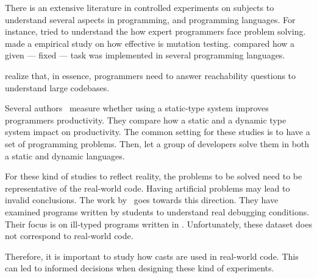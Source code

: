 There is an extensive literature \perse{} in controlled experiments on subjects to understand several aspects in programming, and programming languages.
For instance, \cite{solowayEmpiricalStudiesProgramming1984} tried to understand the how expert programmers face problem solving.
\cite{buddTheoreticalEmpiricalStudies1980} made a empirical study on how effective is mutation testing.
\cite{precheltEmpiricalComparisonSeven2000} compared how a given --- fixed --- task was implemented in several programming languages.

\cite{latozaDevelopersAskReachability2010} realize that, in essence, programmers need to answer reachability questions to understand large codebases.

Several authors~\cite{stuchlikStaticVsDynamic2011,mayerEmpiricalStudyInfluence2012,harlinImpactUsingStaticType2017} measure whether using a static-type system improves programmers productivity.
They compare how a static and a dynamic type system impact on productivity.
The common setting for these studies is to have a set of programming problems.
Then, let a group of developers solve them in both a static and dynamic languages.

For these kind of studies to reflect reality, the problems to be solved need to be representative of the real-world code.
Having artificial problems may lead to invalid conclusions.
The work by~\cite{wuHowTypeErrors2017,wuLearningUserFriendly2017} goes towards this direction. 
They have examined programs written by students to understand real debugging conditions. 
Their focus is on ill-typed programs written in \haskell{}.
Unfortunately, these dataset does not correspond to real-world code. 

Therefore, it is important to study how casts are used in real-world code. 
This can led to informed decisions when designing these kind of experiments. 